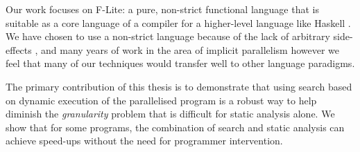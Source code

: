 Our work focuses on F-Lite: a pure, non-strict functional language that is
suitable as a core language of a compiler for a higher-level language like
Haskell \citep{naylor2010reduceron}. We have chosen to use a non-strict language
because of the lack of arbitrary side-effects \citep{whyFPmatters}, and many
years of work in the area of implicit parallelism \citep{hogen1992automatic,
PFPAnIntro, jones1993implicit} however we feel that many of our techniques
would transfer well to other language paradigms.


The primary contribution of this thesis is to demonstrate that using search
based on dynamic execution of the parallelised program is a robust way to help
diminish the \emph{granularity} problem that is difficult for static analysis
alone.  We show that for some programs, the combination of search and static
analysis can achieve speed-ups without the need for programmer intervention.

